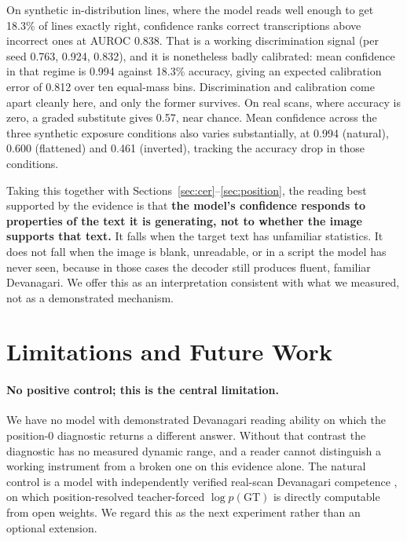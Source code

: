 \documentclass{article}
\begin{document}
On synthetic in-distribution lines, where the model reads well enough to get 18.3\% of lines
exactly right, confidence ranks correct transcriptions above incorrect ones at AUROC 0.838.
That is a working discrimination signal (per seed 0.763, 0.924, 0.832), and it is nonetheless
badly calibrated: mean confidence in that regime is 0.994 against 18.3\% accuracy, giving an
expected calibration error of 0.812 over ten equal-mass bins. Discrimination and calibration
come apart cleanly here, and only the former survives. On real scans, where accuracy is
zero, a graded substitute gives 0.57, near chance. Mean confidence across the three synthetic
exposure conditions also varies substantially, at 0.994 (natural), 0.600 (flattened) and 0.461
(inverted), tracking the accuracy drop in those conditions.

Taking this together with Sections~\ref{sec:cer}--\ref{sec:position}, the reading best
supported by the evidence is that \textbf{the model's confidence responds to properties of the
text it is generating, not to whether the image supports that text.} It falls when the target
text has unfamiliar statistics. It does not fall when the image is blank, unreadable, or in a
script the model has never seen, because in those cases the decoder still produces fluent,
familiar Devanagari. We offer this as an interpretation consistent with what we measured, not
as a demonstrated mechanism.

\section{Limitations and Future Work}
\label{sec:lim}

\paragraph{No positive control; this is the central limitation.} We have no model with
demonstrated Devanagari reading ability on which the position-0 diagnostic returns a different
answer. Without that contrast the diagnostic has no measured dynamic range, and a reader
cannot distinguish a working instrument from a broken one on this evidence alone. The natural
control is a model with independently verified real-scan Devanagari competence
\citep{devanagari2026stresstest}, on which position-resolved teacher-forced
$\log p(\mathrm{GT})$ is directly computable from open weights. We regard this as the next
experiment rather than an optional extension.
\end{document}
